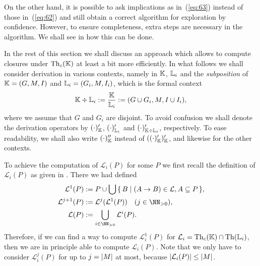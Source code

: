 On the other hand, it is possible to ask implications as in~(\ref{eq:63}) instead of those
in~(\ref{eq:62}) and still obtain a correct algorithm for exploration by confidence.
However, to ensure completeness, extra steps are necessary in the algorithm.  We shall see
in  how this can be done.

In the rest of this section we shall discuss an approach which allows to compute closures
under $\operatorname{Th}_{c}({\mathbb{K}})$ at least a bit more efficiently.  In what follows we shall
consider derivation in various contexts, namely in ${\mathbb{K}}$, ${\mathbb{L}}_{i}$ and the
\emph{subposition} of ${\mathbb{K}} = (G, M, I)$ and ${\mathbb{L}}_{i} = (G_{i}, M, I_{i})$, which is
the formal context
\begin{equation*}
  {\ensuremath{\mathbb{K}}} \div {\ensuremath{\mathbb{L}}}_{i} := \frac {{\mathbb{K}}} {{\mathbb{L}}_{i}} := (G \cup G_{i}, M, I \cup I_{i}),
\end{equation*}
where we assume that $G$ and $G_{i}$ are disjoint.  To avoid confusion we shall denote the
derivation operators by $(\cdot)'_{{\mathbb{K}}}$, $(\cdot)'_{{\mathbb{L}}_{i}}$ and $(\cdot)'_{{\mathbb{K}}
  \div {\ensuremath{\mathbb{L}}}_{i}}$, respectively.  To ease readability, we shall also write
$(\cdot)''_{{\mathbb{K}}}$ instead of $((\cdot)'_{{\mathbb{K}}})'_{{\mathbb{K}}}$, and likewise for the
other contexts.

To achieve the computation of $\mathcal{L}_{i}(P)$ for some $P$ we first recall the
definition of $\mathcal{L}_{i}(P)$ as given in .  There
we had defined
\begin{align*}
  \mathcal{L}^{1}(P) &:= P \cup \bigcup \set{ B \mid (A \to B) \in \mathcal{L}, A
    \subseteq P }, \\
  \mathcal{L}^{j+1}(P) &:= \mathcal{L}^{j}(\mathcal{L}^{1}(P)) \quad (j \in \NN_{> 0}), \\
  \mathcal{L}(P) & := \bigcup_{i \in \NN_{>0}} \mathcal{L}^{i}(P).
\end{align*}
Therefore, if we can find a way to compute $\mathcal{L}_{i}^{1}(P)$ for $\mathcal{L}_{i} =
\operatorname{Th}_{c}({\mathbb{K}}) \cap \operatorname{Th}({\mathbb{L}}_{i})$, then we are in principle able to compute
$\mathcal{L}_{i}(P)$.  Note that we only have to consider $\mathcal{L}_{i}^{j}(P)$ for up
to $j = \lvert M\rvert$ at most, because $\lvert \mathcal{L}_{i}(P) \rvert \le \lvert M\rvert$.

